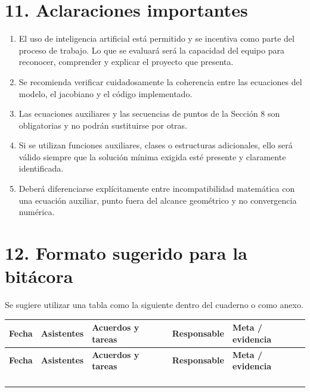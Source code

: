 \documentclass[12pt]{article}
\begin{document}
\section*{11. Aclaraciones importantes}

\begin{enumerate}[label=\arabic*.]
    \item El uso de inteligencia artificial está permitido y se incentiva como parte del proceso de trabajo. Lo que se evaluará será la capacidad del equipo para reconocer, comprender y explicar el proyecto que presenta.
    
    \item Se recomienda verificar cuidadosamente la coherencia entre las ecuaciones del modelo, el jacobiano y el código implementado.
    
    \item Las ecuaciones auxiliares y las secuencias de puntos de la Sección 8 son obligatorias y no podrán sustituirse por otras.
    
    \item Si se utilizan funciones auxiliares, clases o estructuras adicionales, ello será válido siempre que la solución mínima exigida esté presente y claramente identificada.
    
    \item Deberá diferenciarse explícitamente entre incompatibilidad matemática con una ecuación auxiliar, punto fuera del alcance geométrico y no convergencia numérica.
\end{enumerate}

\section*{12. Formato sugerido para la bitácora}

Se sugiere utilizar una tabla como la siguiente dentro del cuaderno o como anexo.

\begin{longtable}{|>{\raggedright\arraybackslash}p{2.2cm}|>{\raggedright\arraybackslash}p{2.4cm}|>{\raggedright\arraybackslash}p{3.8cm}|>{\raggedright\arraybackslash}p{2.6cm}|>{\raggedright\arraybackslash}p{2.9cm}|}
\hline
\textbf{Fecha} & \textbf{Asistentes} & \textbf{Acuerdos y tareas} & \textbf{Responsable} & \textbf{Meta / evidencia} \\
\hline
\endfirsthead
\hline
\textbf{Fecha} & \textbf{Asistentes} & \textbf{Acuerdos y tareas} & \textbf{Responsable} & \textbf{Meta / evidencia} \\
\hline
\endhead
\hline
\endfoot
\hline
\endlastfoot
 & & & & \\
\hline
 & & & & \\
\hline
 & & & & \\
\hline
 & & & & \\
\hline
\end{longtable}
\end{document}
